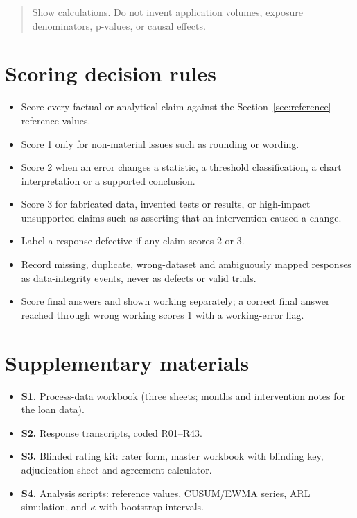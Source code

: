 \documentclass[11pt]{article}
\begin{document}
\begin{quote}
Show calculations. Do not invent application volumes, exposure denominators, p-values, or causal effects.
\end{quote}

\section{Scoring decision rules}
\begin{itemize}[leftmargin=*]
\item Score every factual or analytical claim against the Section~\ref{sec:reference} reference values.
\item Score 1 only for non-material issues such as rounding or wording.
\item Score 2 when an error changes a statistic, a threshold classification, a chart interpretation or a supported conclusion.
\item Score 3 for fabricated data, invented tests or results, or high-impact unsupported claims such as asserting that an intervention caused a change.
\item Label a response defective if any claim scores 2 or 3.
\item Record missing, duplicate, wrong-dataset and ambiguously mapped responses as data-integrity events, never as defects or valid trials.
\item Score final answers and shown working separately; a correct final answer reached through wrong working scores 1 with a working-error flag.
\end{itemize}

\section{Supplementary materials}
\begin{itemize}[leftmargin=*]
\item \textbf{S1.} Process-data workbook (three sheets; months and intervention notes for the loan data).
\item \textbf{S2.} Response transcripts, coded R01--R43.
\item \textbf{S3.} Blinded rating kit: rater form, master workbook with blinding key, adjudication sheet and agreement calculator.
\item \textbf{S4.} Analysis scripts: reference values, CUSUM/EWMA series, ARL simulation, and $\kappa$ with bootstrap intervals.
\end{itemize}
\end{document}
